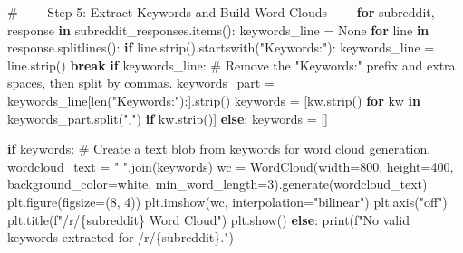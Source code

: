 \documentclass[
  12pt,
  letterpaper,
  DIV=11,
  numbers=noendperiod]{scrartcl}
\newenvironment{Shaded}{\begin{snugshade}}{\end{snugshade}}
\newcommand{\BuiltInTok}[1]{\textcolor[rgb]{0.00,0.23,0.31}{#1}}
\newcommand{\CommentTok}[1]{\textcolor[rgb]{0.37,0.37,0.37}{#1}}
\newcommand{\ControlFlowTok}[1]{\textcolor[rgb]{0.00,0.23,0.31}{\textbf{#1}}}
\newcommand{\DecValTok}[1]{\textcolor[rgb]{0.68,0.00,0.00}{#1}}
\newcommand{\KeywordTok}[1]{\textcolor[rgb]{0.00,0.23,0.31}{\textbf{#1}}}
\newcommand{\NormalTok}[1]{\textcolor[rgb]{0.00,0.23,0.31}{#1}}
\newcommand{\OperatorTok}[1]{\textcolor[rgb]{0.37,0.37,0.37}{#1}}
\newcommand{\SpecialCharTok}[1]{\textcolor[rgb]{0.37,0.37,0.37}{#1}}
\newcommand{\SpecialStringTok}[1]{\textcolor[rgb]{0.13,0.47,0.30}{#1}}
\newcommand{\StringTok}[1]{\textcolor[rgb]{0.13,0.47,0.30}{#1}}
\newcommand{\VariableTok}[1]{\textcolor[rgb]{0.07,0.07,0.07}{#1}}
\begin{document}
\begin{Shaded}
\begin{Highlighting}[]
\CommentTok{\# {-}{-}{-}{-}{-} Step 5: Extract Keywords and Build Word Clouds {-}{-}{-}{-}{-}}
\ControlFlowTok{for}\NormalTok{ subreddit, response }\KeywordTok{in}\NormalTok{ subreddit\_responses.items():}
\NormalTok{    keywords\_line }\OperatorTok{=} \VariableTok{None}
    \ControlFlowTok{for}\NormalTok{ line }\KeywordTok{in}\NormalTok{ response.splitlines():}
        \ControlFlowTok{if}\NormalTok{ line.strip().startswith(}\StringTok{"Keywords:"}\NormalTok{):}
\NormalTok{            keywords\_line }\OperatorTok{=}\NormalTok{ line.strip()}
            \ControlFlowTok{break}
    \ControlFlowTok{if}\NormalTok{ keywords\_line:}
        \CommentTok{\# Remove the "Keywords:" prefix and extra spaces, then split by commas.}
\NormalTok{        keywords\_part }\OperatorTok{=}\NormalTok{ keywords\_line[}\BuiltInTok{len}\NormalTok{(}\StringTok{"Keywords:"}\NormalTok{):].strip()}
\NormalTok{        keywords }\OperatorTok{=}\NormalTok{ [kw.strip() }\ControlFlowTok{for}\NormalTok{ kw }\KeywordTok{in}\NormalTok{ keywords\_part.split(}\StringTok{","}\NormalTok{) }\ControlFlowTok{if}\NormalTok{ kw.strip()]}
    \ControlFlowTok{else}\NormalTok{:}
\NormalTok{        keywords }\OperatorTok{=}\NormalTok{ []}
    
    \ControlFlowTok{if}\NormalTok{ keywords:}
        \CommentTok{\# Create a text blob from keywords for word cloud generation.}
\NormalTok{        wordcloud\_text }\OperatorTok{=} \StringTok{" "}\NormalTok{.join(keywords)}
\NormalTok{        wc }\OperatorTok{=}\NormalTok{ WordCloud(width}\OperatorTok{=}\DecValTok{800}\NormalTok{, height}\OperatorTok{=}\DecValTok{400}\NormalTok{, background\_color}\OperatorTok{=}\StringTok{\textquotesingle{}white\textquotesingle{}}\NormalTok{, min\_word\_length}\OperatorTok{=}\DecValTok{3}\NormalTok{).generate(wordcloud\_text)}
\NormalTok{        plt.figure(figsize}\OperatorTok{=}\NormalTok{(}\DecValTok{8}\NormalTok{, }\DecValTok{4}\NormalTok{))}
\NormalTok{        plt.imshow(wc, interpolation}\OperatorTok{=}\StringTok{"bilinear"}\NormalTok{)}
\NormalTok{        plt.axis(}\StringTok{"off"}\NormalTok{)}
\NormalTok{        plt.title(}\SpecialStringTok{f"/r/}\SpecialCharTok{\{}\NormalTok{subreddit}\SpecialCharTok{\}}\SpecialStringTok{ Word Cloud"}\NormalTok{)}
\NormalTok{        plt.show()}
    \ControlFlowTok{else}\NormalTok{:}
        \BuiltInTok{print}\NormalTok{(}\SpecialStringTok{f"No valid keywords extracted for /r/}\SpecialCharTok{\{}\NormalTok{subreddit}\SpecialCharTok{\}}\SpecialStringTok{."}\NormalTok{)}
\end{Highlighting}
\end{Shaded}
\end{document}
